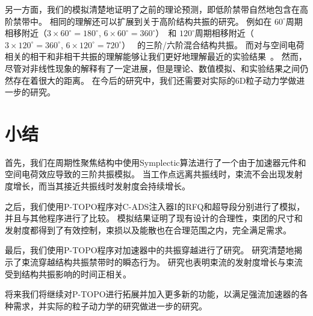 另一方面，我们的模拟清楚地证明了之前的理论预测，即低阶禁带自然地包含在高阶禁带中。
相同的理解还可以扩展到关于高阶结构共振的研究。
例如在 $60^{\circ}$周期相移附近（$3 \times 60^{\circ} = 180^{\circ}$, $6 \times 60^{\circ} = 360^{\circ}$）~\cite{16}和 $120^{\circ}$周期相移附近（$3 \times 120^{\circ} = 360^{\circ}$, $6 \times 120^{\circ} = 720^{\circ}$）~\cite{11,36}
的三阶/六阶混合结构共振。
而对与空间电荷相关的相干和非相干共振的理解能够让我们更好地理解最近的实验结果~\cite{31,32,33}。
然而，尽管对非线性现象的解释有了一定进展，但是理论、数值模拟、和实验结果之间仍然存在着很大的距离。
在今后的研究中，我们还需要对实际的6D粒子动力学做进一步的研究。

\section{小结}                    \label{section:Simulation_conclusion}
首先，我们在周期性聚焦结构中使用Symplectic算法进行了一个由于加速器元件和空间电荷效应导致的三阶共振模拟。
当工作点远离共振线时，束流不会出现发射度增长，而当其接近共振线时发射度会持续增长。

之后，我们使用P-TOPO程序对C-ADS注入器I的RFQ和超导段分别进行了模拟，并且与其他程序进行了比较。
模拟结果证明了现有设计的合理性，束团的尺寸和发射度都得到了有效控制，束损以及能散也在合理范围之内，完全满足需求。

最后，我们使用P-TOPO程序对加速器中的共振穿越进行了研究。
研究清楚地揭示了束流穿越结构共振禁带时的瞬态行为。
研究也表明束流的发射度增长与束流受到结构共振影响的时间正相关。

将来我们将继续对P-TOPO进行拓展并加入更多新的功能，以满足强流加速器的各种需求，并实际的粒子动力学的研究做进一步的研究。